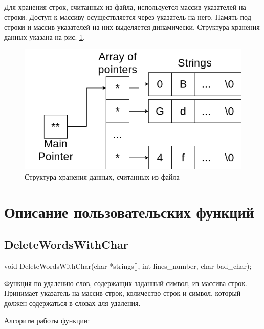 \documentclass[12pt,a4paper]{article}  %
\begin{document}
	Для хранения строк, считанных из файла, используется массив указателей на строки. Доступ к массиву осуществляется через указатель на него. Память под строки и массив указателей на них выделяется динамически. Структура хранения данных указана на рис. \ref{data_schema}.
	\begin{figure}[hpt!]
		\centering
	 	\includegraphics[width=0.6\linewidth]{photo/data_schema}
	 	\caption{Структура хранения данных, считанных из файла}
	 	\label{data_schema}
	\end{figure}
	
	\section*{Описание пользовательских функций}
	
	\subsection*{DeleteWordsWithChar}
	void DeleteWordsWithChar(char *strings[], int lines\_number, char bad\_char);
	
	Функция по удалению слов, содержащих заданный символ, из массива строк. Принимает указатель на массив строк, количество строк и символ, который должен содержаться в словах для удаления.
	
	Алгоритм работы функции:
	
\end{document}
